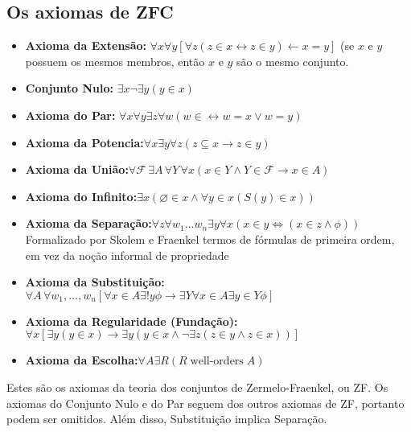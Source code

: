 \documentclass[12pt,a4paper]{article}
\begin{document}
        \subsection{Os axiomas de ZFC}
        \begin{itemize}
            \item {\bf Axioma da Extensão:} $\forall x\forall y[\forall z(z \in x \leftrightarrow z \in y) \leftarrow x = y]$ (se $x$ e $y$ possuem os mesmos membros, então $x$ e $y$ são o mesmo conjunto.
            \item {\bf Conjunto Nulo:} $\exists x \lnot \exists y(y \in x)$ %
            \item {\bf Axioma do Par:} $\forall x \forall y \exists z \forall w (w \in \leftrightarrow w=x \vee w=y)$ %
            \item {\bf Axioma da Potencia:}$\forall x \exists y \forall z (z \subseteq x \rightarrow z \in y)$
            \item {\bf Axioma da União:}$\forall \mathcal{F} \,\exists A \, \forall Y\, \forall x (x \in Y \land Y \in \mathcal{F} \rightarrow x \in A)$
            \item {\bf Axioma do Infinito:}$\exists x ( \varnothing \in x \land \forall y \in x ( S(y) \in x))$
            \item {\bf Axioma da Separação:}$\forall z \forall w_1 \ldots w_n \exists y \forall x (x \in y \iff ( x \in z \land \phi ) )$ Formalizado por Skolem e Fraenkel termos de fórmulas de primeira ordem, em vez da noção informal de propriedade
            \item {\bf Axioma da Substituição:}$\forall A\,\forall w_1,\ldots,w_n [ \forall x \in A \exists ! y \phi \rightarrow \exists Y \forall x \in A \exists y \in Y \phi]$
            \item {\bf Axioma da Regularidade (Fundação):}$\forall x[\exists y(y\in x)\rightarrow \exists y(y\in x\land \lnot \exists z(z\in y\land z\in x))]$
            \item {\bf Axioma da Escolha:}$    \forall A \exists R ( R \;\mbox{well-orders}\; A)$
        \end{itemize} 
    Estes são os axiomas da teoria dos conjuntos de Zermelo-Fraenkel, ou ZF. Os axiomas do Conjunto Nulo e do Par seguem dos outros axiomas de ZF, portanto podem ser omitidos. Além disso, Substituição implica Separação. %
    
\end{document}
